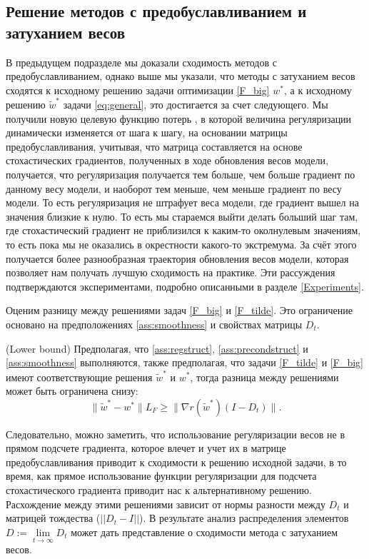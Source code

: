 \subsection{Решение методов с предобуславливанием и затуханием весов}

В предыдущем подразделе мы доказали сходимость методов с предобуславливанием, однако выше мы указали, что методы с затуханием весов сходятся к исходному решению задачи оптимизации \eqref{F_big} $w^*$, а к исходному решению $\widetilde{w}^*$ задачи \eqref{eq:general}, это достигается за счет следующего. Мы получили новую целевую функцию потерь \label{F_tilde_problem}, в которой величина регуляризации динамически изменяется от шага к шагу, на основании матрицы предобуславливания, учитывая, что матрица составляется на основе стохастических градиентов, полученных в ходе обновления весов модели, получается, что регуляризация получается тем больше, чем больше градиент по данному весу модели, и наоборот тем меньше, чем меньше градиент по весу модели. То есть регуляризация не штрафует веса модели, где градиент вышел на значения близкие к нулю. То есть мы стараемся выйти делать больший шаг там, где стохастический градиент не приблизился к каким-то околнулевым значениям, то есть пока мы не оказались в окрестности какого-то экстремума. За счёт этого получается более разнообразная траектория обновления весов модели, которая позволяет нам получать лучшую сходимость на практике. Эти рассуждения подтверждаются экспериментами, подробно описанными в разделе \ref{Experiments}.

Оценим разницу между решениями задач \eqref{F_big} и \eqref{F_tilde}. Это ограничение основано на предположениях \eqref{ass:smoothness} и свойствах матрицы $D_t$.

\begin{lemma}\label{lemma:lowerbondF}{(Lower bound)}
Предполагая, что \ref{ass:regstruct}, \ref{ass:precondstruct} и \ref{ass:smoothness} выполняются, также предполагая, что задачи \eqref{F_tilde} и \eqref{F_big} имеют соответствующие решения $\widetilde{w}^*$ и $w^*$, тогда разница между решениями может быть ограничена снизу:
    \begin{equation*}
        \|\widetilde{w}^* - w^* \| L_F \geq \| \nabla r (\widetilde{w}^*) (I - D_t)\|.
    \end{equation*}
\end{lemma}

Следовательно, можно заметить, что использование регуляризации весов не в прямом подсчете градиента, которое влечет и учет их в матрице предобуславливания приводит к сходимости к решению исходной задачи, в то время, как прямое использование функции регуляризации для подсчета стохастического градиента приводит нас к альтернативному решению. Расхождение между этими решениями зависит от нормы разности между $D_t$ и матрицей тождества ($||D_t - I||$).
В результате анализ распределения элементов $D := \lim\limits_{t \to \infty} D_t$ может дать представление о сходимости метода с затуханием весов.

